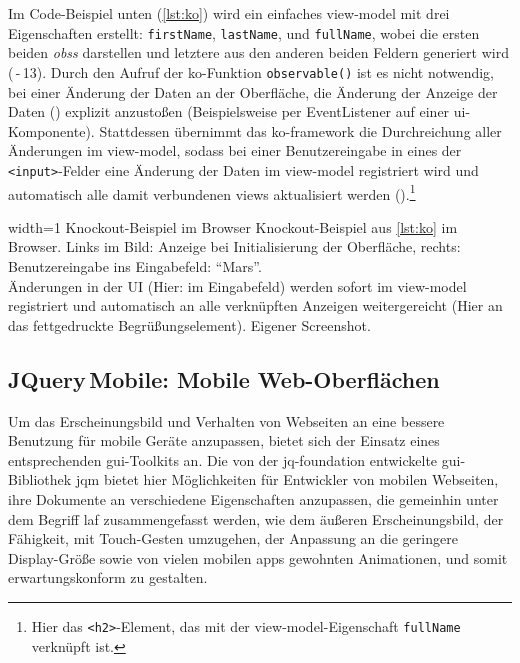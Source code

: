 Im Code-Beispiel unten (\autoref{lst:ko}) wird ein einfaches \gls{view-model} mit drei Eigenschaften erstellt: \lstinline|firstName|, \lstinline|lastName|, und \lstinline|fullName|, wobei die ersten beiden \emph{\glspl{obs}} darstellen und letztere aus den anderen beiden Feldern generiert wird (\,-\,13).
Durch den Aufruf der \gls{ko}-Funktion \lstinline|observable()| ist es nicht notwendig, bei einer Änderung der Daten an der Oberfläche, die Änderung der Anzeige der Daten () explizit anzustoßen (Beispielsweise per EventListener auf einer \gls{ui}-Komponente).
Stattdessen übernimmt das \gls{ko}-\gls{framework} die Durchreichung aller Änderungen im \gls{view-model}, sodass bei einer Benutzereingabe in eines der \lstinline|<input>|-Felder eine Änderung der Daten im \gls{view-model} registriert wird und automatisch alle damit verbundenen \glspl{view} aktualisiert werden ().\footnote{Hier das \texttt{<h2>}-Element, das mit der \gls{view-model}-Eigenschaft \texttt{fullName} verknüpft ist.}


	{width=1\textwidth}
	{Knockout-Beispiel im Browser}
		{Knockout-Beispiel aus \autoref{lst:ko} im Browser. Links im Bild: Anzeige bei Initialisierung der Oberfläche, rechts: Benutzereingabe ins Eingabefeld: \enquote{Mars}. \\ Änderungen in der UI (Hier: im Eingabefeld) werden sofort im \gls{view-model} registriert und automatisch an alle verknüpften Anzeigen weitergereicht (Hier an das fettgedruckte Begrüßungselement).}
	{Eigener Screenshot.}

\subsection{JQuery\,Mobile: Mobile Web-Oberflächen}


Um das Erscheinungsbild und Verhalten von Webseiten an eine bessere Benutzung für mobile Geräte anzupassen, bietet sich der Einsatz eines entsprechenden \gls{gui}-Toolkits an. 
Die von der \gls{jq-foundation} entwickelte \gls{gui}-Bibliothek \gls{jqm} bietet hier Möglichkeiten für Entwickler von mobilen Webseiten, ihre Dokumente an verschiedene Eigenschaften anzupassen, die gemeinhin unter dem Begriff \gls{laf} zusammengefasst werden, wie dem äußeren Erscheinungsbild, der Fähigkeit, mit Touch-Gesten umzugehen, der Anpassung an die geringere Display-Größe sowie von vielen mobilen \glspl{app} gewohnten Animationen, und somit erwartungskonform zu gestalten.

